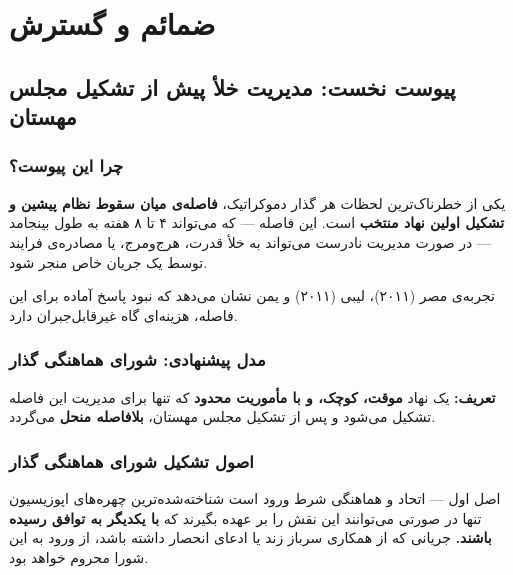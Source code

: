 \part{ضمائم و گسترش}
\label{part:appendices}

\chapter{پیوست نخست: مدیریت خلأ پیش از تشکیل مجلس مهستان}
\label{app:preassembly}

\section*{چرا این پیوست؟}

یکی از خطرناک‌ترین لحظات هر گذار دموکراتیک، \textbf{فاصله‌ی میان سقوط نظام پیشین
و تشکیل اولین نهاد منتخب} است. این فاصله --- که می‌تواند ۴ تا ۸ هفته به طول
بینجامد --- در صورت مدیریت نادرست می‌تواند به خلأ قدرت، هرج‌ومرج، یا مصادره‌ی
فرایند توسط یک جریان خاص منجر شود.

تجربه‌ی مصر (۲۰۱۱)، لیبی (۲۰۱۱) و یمن نشان می‌دهد که نبود پاسخ آماده برای این
فاصله، هزینه‌ای گاه غیرقابل‌جبران دارد.

\section{مدل پیشنهادی: شورای هماهنگی گذار}

\begin{dangerbox}
\textbf{تعریف:} یک نهاد \textbf{موقت، کوچک، و با مأموریت محدود} که تنها برای مدیریت
این فاصله تشکیل می‌شود و پس از تشکیل مجلس مهستان، \textbf{بلافاصله منحل} می‌گردد.
\end{dangerbox}

\section{اصول تشکیل شورای هماهنگی گذار}

\begin{bandbox}{اصل اول --- اتحاد و هماهنگی شرط ورود است}
شناخته‌شده‌ترین چهره‌های اپوزیسیون تنها در صورتی می‌توانند این نقش را بر عهده
بگیرند که \textbf{با یکدیگر به توافق رسیده باشند.} جریانی که از همکاری سرباز زند
یا ادعای انحصار داشته باشد، از ورود به این شورا محروم خواهد بود.
\end{bandbox}

